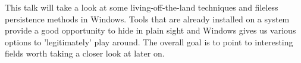 \def\abstracttitle{Hidden in Plain Sight}
\def\abstractcomment{Regular Talk}
\def\abstractowner{Essy}

\thispagestyle{abstract}

This talk will take a look at some living-off-the-land techniques and fileless persistence methods in Windows. Tools that are already installed on a system provide a good opportunity to hide in plain sight and Windows gives us various options to 'legitimately' play around.
The overall goal is to point to interesting fields worth taking a closer look at later on.
